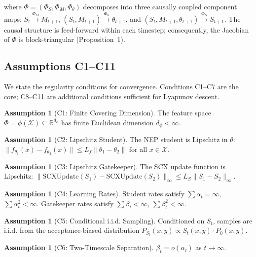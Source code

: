 \documentclass[11pt,a4paper]{article}
\theoremstyle{plain}
\theoremstyle{definition}
\newtheorem{assumption}[theorem]{Assumption}
\theoremstyle{remark}
\newcommand{\R}{\mathbb{R}}
\newcommand{\X}{\mathcal{X}}
\begin{document}
where $\Phi = (\Phi_S, \Phi_M, \Phi_\theta)$ decomposes into three causally coupled component maps: $S_t \xrightarrow{\Phi_M} M_{t+1}$, $(S_t, M_{t+1}) \xrightarrow{\Phi_\theta} \theta_{t+1}$, and $(S_t, M_{t+1}, \theta_{t+1}) \xrightarrow{\Phi_S} S_{t+1}$. The causal structure is feed-forward within each timestep; consequently, the Jacobian of $\Phi$ is block-triangular (Proposition~1).

\subsection{Assumptions C1--C11}

We state the regularity conditions for convergence. Conditions C1--C7 are the core; C8--C11 are additional conditions sufficient for Lyapunov descent.

\begin{assumption}[C1: Finite Covering Dimension]\label{ass:c1}
    The feature space $\Phi = \phi(\X) \subseteq \R^{d_\phi}$ has finite Euclidean dimension $d_\phi < \infty$.
\end{assumption}

\begin{assumption}[C2: Lipschitz Student]\label{ass:c2}
    The NEP student is Lipschitz in $\theta$: $\|f_{\theta_1}(x) - f_{\theta_2}(x)\| \leq L_f \|\theta_1 - \theta_2\|$ for all $x \in \X$.
\end{assumption}

\begin{assumption}[C3: Lipschitz Gatekeeper]\label{ass:c3}
    The SCX update function is Lipschitz: $\|\text{SCXUpdate}(S_1) - \text{SCXUpdate}(S_2)\|_\infty \leq L_S \|S_1 - S_2\|_\infty$.
\end{assumption}

\begin{assumption}[C4: Learning Rates]\label{ass:c4}
    Student rates satisfy $\sum \alpha_t = \infty$, $\sum \alpha_t^2 < \infty$. Gatekeeper rates satisfy $\sum \beta_t < \infty$, $\sum \beta_t^2 < \infty$.
\end{assumption}

\begin{assumption}[C5: Conditional i.i.d. Sampling]\label{ass:c5}
    Conditioned on $S_t$, samples are i.i.d. from the acceptance-biased distribution $P_{S_t}(x,y) \propto S_t(x,y) \cdot P_0(x,y)$.
\end{assumption}

\begin{assumption}[C6: Two-Timescale Separation]\label{ass:c6}
    $\beta_t = o(\alpha_t)$ as $t \to \infty$.
\end{assumption}
\end{document}
